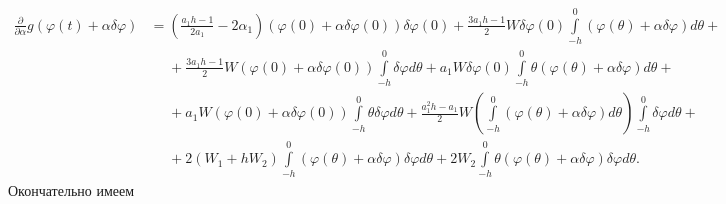 \documentclass[a4paper,14pt]{article}
\begin{document}
\begin{equation}
  \label{eq:first-pd}
  \begin{aligned}
    \frac{\partial }{\partial \alpha}
    g(\varphi(t) + \alpha \delta \varphi)
    &=
      \left(
      \frac{a_1 h - 1}{2 a_1}
      - 2 \alpha_1
      \right)
      \left(
      \varphi(0) + \alpha \delta \varphi(0)
      \right)
      \delta \varphi(0)
      +
      \frac{3 a_1 h - 1}{2}
      W
      \delta \varphi(0)
      \int\limits_{-h}^{0} \left(
      \varphi(\theta) + \alpha \delta \varphi
      \right) d\theta + \\
    &\phantom{=}
      +
      \frac{3 a_1 h - 1}{2}
      W
      \left( \varphi(0) + \alpha \delta \varphi(0) \right)
      \int\limits_{-h}^{0} \delta \varphi d\theta
      +
      a_1 W \delta \varphi(0)
      \int\limits_{-h}^{0} \theta \left(
      \varphi(\theta) + \alpha \delta \varphi
      \right)d\theta + \\
    &\phantom{=}
      +
      a_1 W \left( \varphi(0) + \alpha \delta \varphi(0) \right)
      \int\limits_{-h}^{0} \theta \delta \varphi d\theta
      +
      \frac{a_1^2 h - a_1}{2} W
      \left(
      \int\limits_{-h}^{0} \left(
      \varphi(\theta) + \alpha \delta \varphi
      \right) d\theta
      \right)
      \int\limits_{-h}^{0} \delta \varphi d\theta
      + \\
    &\phantom{=}
      +
      2 \left( W_1 + h W_2 \right)
      \int\limits_{-h}^{0} \left(
      \varphi(\theta) + \alpha \delta \varphi
      \right) \delta \varphi d\theta
      +
      2 W_2
      \int\limits_{-h}^{0} \theta \left(
      \varphi(\theta) + \alpha \delta \varphi
      \right) \delta \varphi d\theta.
  \end{aligned}
\end{equation}
Окончательно имеем
\end{document}
